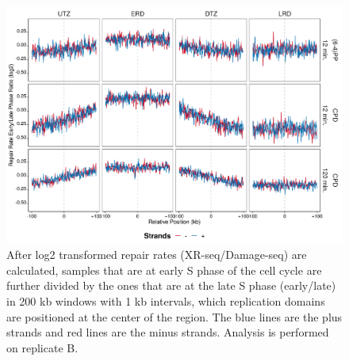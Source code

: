 \begin{figure}[H]
\begin{center}
\includegraphics[width=\textwidth]{Chapters/7_appendix/figures/supfig27}
\caption[Repair rate early/late phase ratio of replication domains in 200 kb (replicate B).]{After log2 transformed repair rates (XR-seq/Damage-seq) are calculated, samples that are at early S phase of the cell cycle are further divided by the ones that are at the late S phase (early/late) in 200 kb windows with 1 kb intervals, which replication domains are positioned at the center of the region. The blue lines are the plus strands and red lines are the minus strands. Analysis is performed on replicate B.}
\label{supfig:rrel200repdomainB}
\end{center}
\end{figure}


